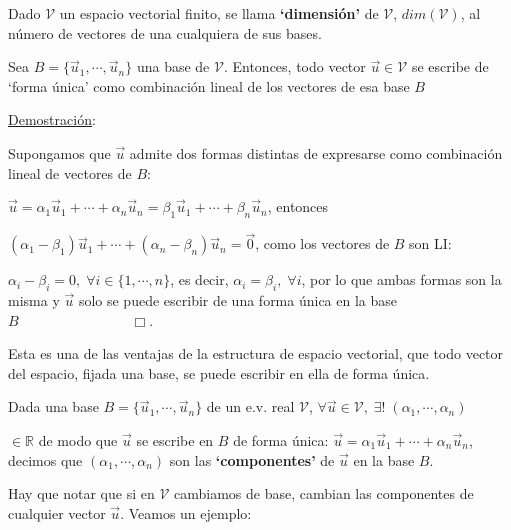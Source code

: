 \begin{definition}

Dado $\mathcal V$ un espacio vectorial finito, se	llama \textbf{`dimensión'} de  $\mathcal V$,  $dim(\mathcal V)$, al número de vectores de una cualquiera de sus bases.
\end{definition}


\begin{theorem}

Sea $B=\{\vec u_1, \cdots, \vec u_n \}$ una base de $\mathcal V$. Entonces, todo vector $\vec u \in \mathcal V$ se escribe de `forma única'	como combinación lineal de los vectores de esa base $B$
\end{theorem}

\underline{Demostración}:

\noindent \textcolor{gris}{Supongamos que $\vec u$ admite dos formas distintas de expresarse como combinación lineal de vectores de $B$:  }	

\noindent \textcolor{gris}{$\vec u=\alpha_1 \vec u_1+ \cdots + \alpha_n \vec u_n=\beta_1 \vec u_1+ \cdots + \beta_n \vec u_n $, entonces   }	

\noindent \textcolor{gris}{$(\alpha_1-\beta_1) \vec u_1+\cdots + (\alpha_n-\beta_n) \vec u_n= \vec 0$, como los vectores de $B$ son LI:   }	

\noindent \textcolor{gris}{$\alpha_i - \beta_i=0,\; \forall i\in \{1, \cdots, n\}$, es decir, $\alpha_i=\beta_i, \; \forall i$, por lo que ambas formas son la misma y $\vec u$ solo se puede escribir de una forma única en la base $B \qquad \qquad \qquad \qquad \Box$.   }	



Esta es una de las ventajas de la estructura de espacio vectorial, que todo vector del espacio, fijada una base, se puede escribir en ella de forma única.

Dada una base $B=\{\vec u_1, \cdots, \vec u_n \}$ de un e.v. real $\mathcal V$, $\forall \vec u \in \mathcal V, \; \exists !\; (\alpha_1, \cdots , \alpha_n )$

\vspace{-2mm} \noindent $\in \mathbb R$ de modo que $\vec u$ se escribe en $B$ de forma única:
$\vec u=\alpha_1 \vec u_1+ \cdots + \alpha_n \vec u_n$, decimos que $(\alpha_1, \cdots, \alpha_n)$ son las \textbf{`componentes'} de $\vec u$ en la base $B$.

Hay que notar que si en $\mathcal V$ cambiamos de base, cambian las componentes de cualquier vector $\vec u$. Veamos un ejemplo:

